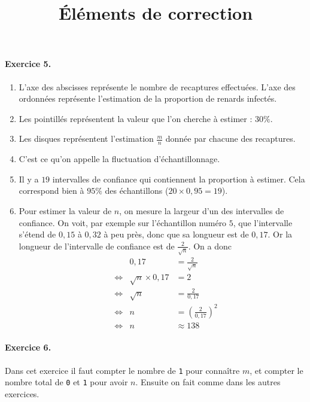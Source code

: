 \documentclass[11pt]{article}
\title{Éléments de correction}
\date{}
\begin{document}
\maketitle\thispagestyle{fancy}

\paragraph{Exercice 5.}
\begin{enumerate}
  \item L'axe des abscisses représente le nombre de recaptures effectuées. L'axe
    des ordonnées représente l'estimation de la proportion de renards infectés.
  \item Les pointillés représentent la valeur que l'on cherche à estimer :
    $30\%$.
  \item Les disques représentent l'estimation $\frac{m}{n}$ donnée par chacune
    des recaptures.
  \item C'est ce qu'on appelle la fluctuation d'échantillonnage.
  \item Il y a $19$ intervalles de confiance qui contiennent la proportion à
    estimer. Cela correspond bien à $95\%$ des échantillons ($20\times 0,95=19$).
  \item Pour estimer la valeur de $n$, on mesure la largeur d'un des intervalles
    de confiance. On voit, par exemple sur l'échantillon numéro $5$, que
    l'intervalle s'étend de $0,15$ à $0,32$ à peu près, donc que sa longueur est
    de $0,17$. Or la longueur de l'intervalle de confiance est de
    $\frac{2}{\sqrt n}$. On a donc
    \begin{align*}
     & & 0,17 &= \frac{2}{\sqrt n} \\
      &\Leftrightarrow& \sqrt n \times 0,17 &= 2 \\
      &\Leftrightarrow& \sqrt n &= \frac{2}{0,17} \\
      &\Leftrightarrow& n &= \left( \frac{2}{0,17} \right)^2 \\
      &\Leftrightarrow& n &\approx 138 
    \end{align*}
\end{enumerate}

\paragraph{Exercice 6.} Dans cet exercice il faut compter le nombre de
\texttt{1} pour
connaître $m$, et compter le nombre total de \texttt{0} et \texttt{1} pour avoir $n$.
Ensuite on fait comme dans les autres exercices.
\end{document}
